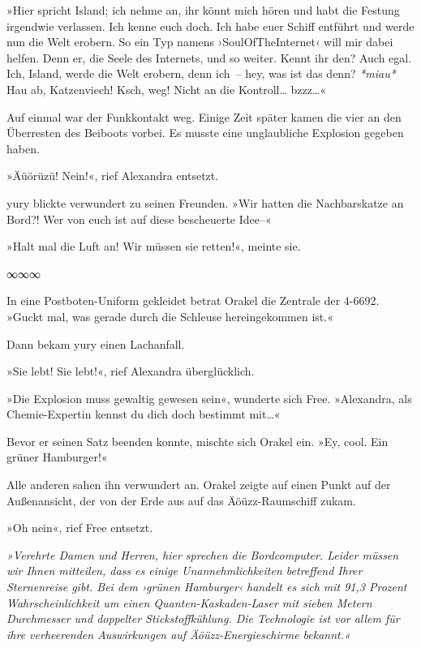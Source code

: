 »Hier spricht Island; ich nehme an, ihr könnt mich hören und habt die Festung irgendwie verlassen. Ich kenne euch doch. Ich habe euer Schiff entführt und werde nun die Welt erobern. So ein Typ namens ›SoulOfTheInternet‹ will mir dabei helfen. Denn er, die Seele des Internets, und so weiter. Kennt ihr den? Auch egal. Ich, Island, werde die Welt erobern, denn ich~– hey, was ist das denn? \textit{*miau*} Hau ab, Katzenviech! Ksch, weg! Nicht an die Kontroll… bzzz…«

Auf einmal war der Funkkontakt weg. Einige Zeit später kamen die vier an den Überresten des Beiboots vorbei. Es musste eine unglaubliche Explosion gegeben haben.

»Äüörüzü! Nein!«, rief Alexandra entsetzt.

yury blickte verwundert zu seinen Freunden. »Wir hatten die Nachbarskatze an Bord?! Wer von euch ist auf diese bescheuerte Idee–«

»Halt mal die Luft an! Wir müssen sie retten!«, meinte sie.

\begin{center}
    ∞∞∞
\end{center}

In eine Postboten-Uniform gekleidet betrat Orakel die Zentrale der 4-6692. »Guckt mal, was gerade durch die Schleuse hereingekommen ist.«

Dann bekam yury einen Lachanfall.

»Sie lebt! Sie lebt!«, rief Alexandra überglücklich.

»Die Explosion muss gewaltig gewesen sein«, wunderte sich Free. »Alexandra, als Chemie-Expertin kennst du dich doch bestimmt mit…«

Bevor er seinen Satz beenden konnte, mischte sich Orakel ein. »Ey, cool. Ein grüner Hamburger!«

Alle anderen sahen ihn verwundert an. Orakel zeigte auf einen Punkt auf der Außenansicht, der von der Erde aus auf das Äöüzz-Raumschiff zukam.

»Oh nein«, rief Free entsetzt.

\textit{»Verehrte Damen und Herren, hier sprechen die Bordcomputer. Leider müssen wir Ihnen mitteilen, dass es einige Unannehmlichkeiten betreffend Ihrer Sternenreise gibt. Bei dem ›grünen Hamburger‹ handelt es sich mit 91,3 Prozent Wahrscheinlichkeit um einen Quanten-Kaskaden-Laser mit sieben Metern Durchmesser und doppelter Stickstoffkühlung. Die Technologie ist vor allem für ihre verheerenden Auswirkungen auf Äöüzz-Energieschirme bekannt.«}

